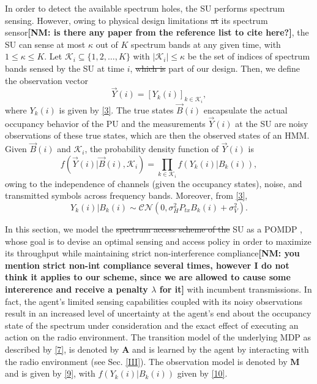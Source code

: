 \documentclass[10pt,twocolumn]{IEEEtran}
\newcommand{\sst}[1]{\st{#1}}
\newcommand{\nm}[1]{{\color{blue}\bf{[NM: #1]}}}
\newcommand{\add}[1]{{\color{red}{#1}}}
\begin{document}
In order to detect the available spectrum holes, the SU performs spectrum sensing. However, owing to physical design limitations\sst{ at} \add{of} its spectrum sensor\nm{is there any paper from the reference list to cite here?}, the SU can sense at most $\kappa$ out of $K$ spectrum bands at any given time, with $1{\leq}\kappa{\leq}K$. Let $\mathcal K_{i}{\subseteq}\{1,2,\dots,K\}$ with $|\mathcal K_i|{\leq}\kappa$ be the set of indices of spectrum bands sensed by the SU at time $i$,\sst{ which is} part of our design.
Then, we define the observation vector
\begin{equation}\label{8}
    \vec{Y}(i) = [Y_k(i)]_{k {\in} \mathcal K_i},
\end{equation}
where $Y_k(i)$ is given by \eqref{3}.
The true states $\vec{B}(i)$ encapsulate the actual occupancy behavior of the PU and the measurements $\vec{Y}(i)$ at the SU are noisy observations of these true states, which are then the observed states of an HMM. Given $\vec{B}(i)$ and $\mathcal K_i$, the probability density function of $\vec{Y}(i)$ is
\begin{equation}\label{9}
    f(\vec{Y}(i)|\vec{B}(i), \mathcal K_i) = \prod_{k \in \mathcal K_i} f(Y_k(i)|B_k(i)),
\end{equation}
owing to the independence of channels (given the occupancy states), noise, and transmitted symbols across frequency bands. Moreover, from \eqref{3},
\begin{equation}\label{10}
 Y_k(i)|B_k(i) \sim \mathcal{CN}(0, \sigma_H^2P_{tx}B_k(i) + \sigma_V^2).
\end{equation}

In this section, we model the\sst{ spectrum access scheme of the} SU as a POMDP \add{agent}, whose goal is to devise an optimal sensing and access policy in order to maximize its throughput while maintaining strict non-interference compliance\nm{you mention strict non-int compliance several times,
however I do not think it applies to our scheme, since we are allowed to cause some intererence and receive a penalty $\lambda$ for it} with incumbent transmissions. In fact, the agent's limited sensing capabilities coupled with its noisy observations result in an increased level of uncertainty at the agent's end about the occupancy state of the spectrum under consideration and the exact effect of executing an action on the radio environment. The transition model of the underlying MDP as described by \eqref{7}, is denoted by $\mathbf{A}$ and is learned by the agent by interacting with the radio environment (see Sec. \ref{III}). The observation model is denoted by $\mathbf{M}$ and is given by \eqref{9}, with $f(Y_k(i)|B_k(i))$ given by \eqref{10}. 
\end{document}
